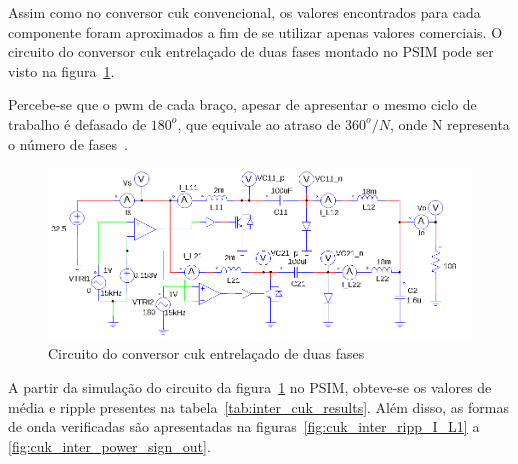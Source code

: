 \documentclass[
	12pt,				%
	openany,
	onseside,
	a4paper,			%
	english,			%
	french,				%
	spanish,			%
	brazil,				%
	]{abntex2}
\begin{document}
Assim como no conversor cuk convencional, os valores encontrados para cada componente foram aproximados a fim de se utilizar apenas valores comerciais. O circuito do conversor cuk entrelaçado de duas fases montado no PSIM pode ser visto na figura~\ref{fig:interv_cuk_conv_psim_circuit}.

Percebe-se que o pwm de cada braço, apesar de apresentar o mesmo ciclo de trabalho é defasado de $180^o$, que equivale ao atraso de $360^o/N$, onde N representa o número de fases~\cite{JOSEPH_2015_Intervealed_CUK}.

\begin{figure}[htbp]%
	\begin{center}%
		\includegraphics[width= \textwidth]{interv_cuk_psim_circ}
		\caption{Circuito do conversor cuk entrelaçado de duas fases}
		\label{fig:interv_cuk_conv_psim_circuit}
	\end{center}
\end{figure}

A partir da simulação do circuito da figura~\ref{fig:interv_cuk_conv_psim_circuit} no PSIM, obteve-se os valores de média e ripple presentes na tabela~\ref{tab:inter_cuk_results}. Além disso, as formas de onda verificadas são apresentadas na figuras~\ref{fig:cuk_inter_ripp_I_L1} a \ref{fig:cuk_inter_power_sign_out}.\
\end{document}

